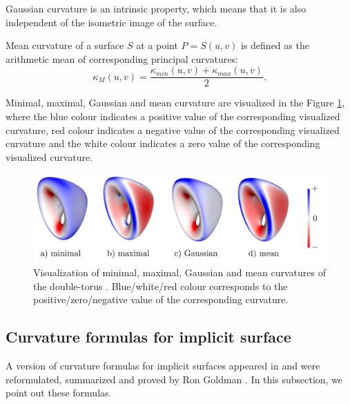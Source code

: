 Gaussian curvature is an
intrinsic property, which means that it is also independent of the isometric image of the surface.

\begin{definition}
    Mean curvature of a surface $S$ at a point $P=S(u,v)$ is defined as
    the arithmetic mean of corresponding principal curvatures:
    $$\kappa_M(u, v) = \frac{\kappa_{min}(u,v) + \kappa_{max}(u,v)}{2}.$$
\end{definition}

Minimal, maximal, Gaussian and mean curvature are visualized in the Figure \ref{img:16},
where the blue colour indicates a positive value of the corresponding visualized curvature,
red colour indicates a negative value of the corresponding visualized curvature
and the white colour indicates a zero value of the corresponding visualized curvature.

\begin{figure}
    \centerline{\includegraphics[scale=0.5]{images/img16}}
    \caption[Visualisation of the curvatures of the double-torus]
    {Visualization of minimal, maximal, Gaussian and mean curvatures of the double-torus \cite{novello2021differential}.
    Blue/white/red colour corresponds to the positive/zero/negative value of the corresponding curvature.}
    \label{img:16}
\end{figure}

\subsection{Curvature formulas for implicit surface}

A version of curvature formulas for implicit surfaces appeared in \cite{spivak1975comprehensive}
and were reformulated, summarized and proved by Ron Goldman \cite{goldman2005curvature}.
In this subsection, we point out these formulas.


